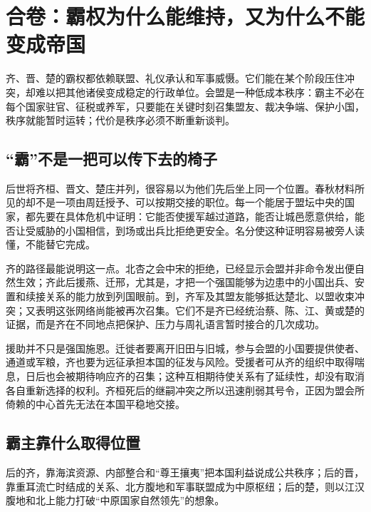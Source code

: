\section{合卷：霸权为什么能维持，又为什么不能变成帝国}

齐、晋、楚的霸权都依赖联盟、礼仪承认和军事威慑。它们能在某个阶段压住冲突，却难以把其他诸侯变成稳定的行政单位。会盟是一种低成本秩序：霸主不必在每个国家驻官、征税或养军，只要能在关键时刻召集盟友、裁决争端、保护小国，秩序就能暂时运转；代价是秩序必须不断重新谈判。

\subsection{“霸”不是一把可以传下去的椅子}

后世将齐桓、晋文、楚庄并列，很容易以为他们先后坐上同一个位置。春秋材料所见的却不是一项由周廷授予、可以按期交接的职位。每一个能居于盟坛中央的国家，都先要在具体危机中证明：它能否使援军越过道路，能否让城邑愿意供给，能否让受威胁的小国相信，到场或出兵比拒绝更安全。名分使这种证明容易被旁人读懂，不能替它完成。

齐的路径最能说明这一点。北杏之会中宋的拒绝，已经显示会盟并非命令发出便自然生效；齐此后援燕、迁邢，尤其是，才把一个强国能够为边患中的小国出兵、安置和续接关系的能力放到列国眼前。到，齐军及其盟友能够抵达楚北、以盟收束冲突；又表明这张网络尚能被再次召集。它们不是齐已经统治蔡、陈、江、黄或楚的证据，而是齐在不同地点把保护、压力与周礼语言暂时接合的几次成功。

援助并不只是强国施恩。迁徙者要离开旧田与旧城，参与会盟的小国要提供使者、通道或军粮，齐也要为远征承担本国的征发与风险。受援者可从齐的组织中取得喘息，日后也会被期待响应齐的召集；这种互相期待使关系有了延续性，却没有取消各自重新选择的权利。齐桓死后的继嗣冲突之所以迅速削弱其号令，正因为盟会所倚赖的中心首先无法在本国平稳地交接。

\subsection{霸主靠什么取得位置}

后的齐，靠海滨资源、内部整合和“尊王攘夷”把本国利益说成公共秩序；后的晋，靠重耳流亡时结成的关系、北方腹地和军事联盟成为中原枢纽；后的楚，则以江汉腹地和北上能力打破“中原国家自然领先”的想象。

